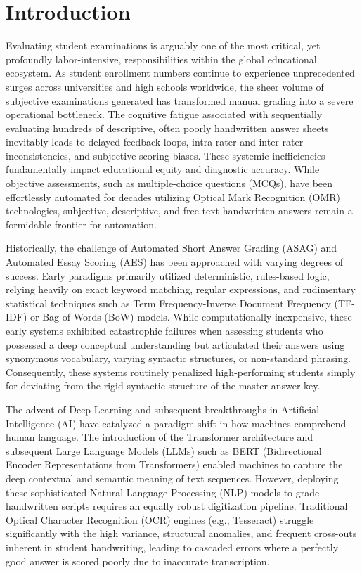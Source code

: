 \documentclass[conference]{IEEEtran}
\begin{document}
\section{Introduction}
Evaluating student examinations is arguably one of the most critical, yet profoundly labor-intensive, responsibilities within the global educational ecosystem. As student enrollment numbers continue to experience unprecedented surges across universities and high schools worldwide, the sheer volume of subjective examinations generated has transformed manual grading into a severe operational bottleneck. The cognitive fatigue associated with sequentially evaluating hundreds of descriptive, often poorly handwritten answer sheets inevitably leads to delayed feedback loops, intra-rater and inter-rater inconsistencies, and subjective scoring biases. These systemic inefficiencies fundamentally impact educational equity and diagnostic accuracy. While objective assessments, such as multiple-choice questions (MCQs), have been effortlessly automated for decades utilizing Optical Mark Recognition (OMR) technologies, subjective, descriptive, and free-text handwritten answers remain a formidable frontier for automation.

Historically, the challenge of Automated Short Answer Grading (ASAG) and Automated Essay Scoring (AES) has been approached with varying degrees of success. Early paradigms primarily utilized deterministic, rules-based logic, relying heavily on exact keyword matching, regular expressions, and rudimentary statistical techniques such as Term Frequency-Inverse Document Frequency (TF-IDF) or Bag-of-Words (BoW) models. While computationally inexpensive, these early systems exhibited catastrophic failures when assessing students who possessed a deep conceptual understanding but articulated their answers using synonymous vocabulary, varying syntactic structures, or non-standard phrasing. Consequently, these systems routinely penalized high-performing students simply for deviating from the rigid syntactic structure of the master answer key.

The advent of Deep Learning and subsequent breakthroughs in Artificial Intelligence (AI) have catalyzed a paradigm shift in how machines comprehend human language. The introduction of the Transformer architecture and subsequent Large Language Models (LLMs) such as BERT (Bidirectional Encoder Representations from Transformers) enabled machines to capture the deep contextual and semantic meaning of text sequences. However, deploying these sophisticated Natural Language Processing (NLP) models to grade handwritten scripts requires an equally robust digitization pipeline. Traditional Optical Character Recognition (OCR) engines (e.g., Tesseract) struggle significantly with the high variance, structural anomalies, and frequent cross-outs inherent in student handwriting, leading to cascaded errors where a perfectly good answer is scored poorly due to inaccurate transcription.
\end{document}
